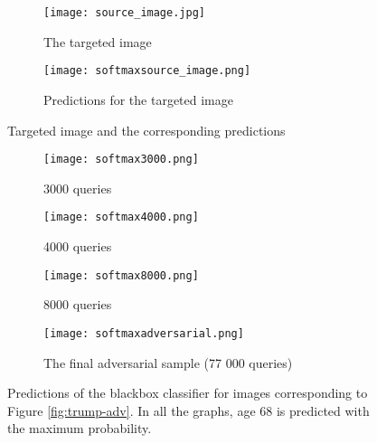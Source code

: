 \begin{figure}
\begin{subfigure}{.5\textwidth}
  \centering
  \texttt{[image: source\_image.jpg]}
  \caption{The targeted image}
\end{subfigure}
\begin{subfigure}{.5\textwidth}
  \centering
  \texttt{[image: softmaxsource\_image.png]}
  \caption{Predictions for the targeted image}
\end{subfigure}

\caption{Targeted image and the corresponding predictions}
\label{fig:targeted-image-softmax}
\end{figure}

\begin{figure}

\begin{subfigure}{.5\textwidth}
  \centering%
  \texttt{[image: softmax3000.png]}
  \caption{3000 queries}
\end{subfigure}
\begin{subfigure}{.5\textwidth}
  \centering%
  \texttt{[image: softmax4000.png]}
  \caption{4000 queries}
\end{subfigure}


\begin{subfigure}{.5\textwidth}
  \centering%
  \texttt{[image: softmax8000.png]}
  \caption{8000 queries}
\end{subfigure}
\begin{subfigure}{.5\textwidth}
  \centering%
  \texttt{[image: softmaxadversarial.png]}
  \caption{The final adversarial sample (77 000 queries)}
\end{subfigure}

\caption{Predictions of the blackbox classifier for images corresponding to Figure \ref{fig:trump-adv}. In all the graphs, age 68 is predicted with the maximum probability.}
\label{fig:trump-softmax}
\end{figure}


